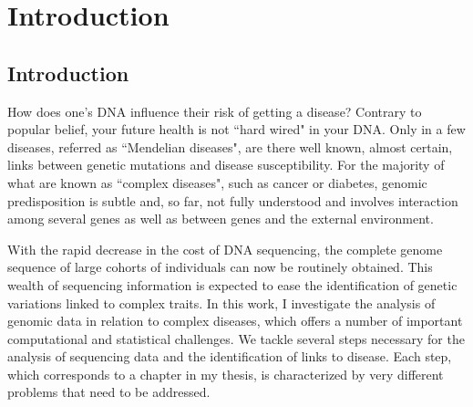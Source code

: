 \chapter{Introduction \label{ch:intro}}

\section{Introduction}

How does one's DNA influence their risk of getting a disease? Contrary to popular belief, your future health is not ``hard wired" in your DNA. 
Only in a few diseases, referred as ``Mendelian diseases", are there well known, almost certain, links between genetic mutations and disease susceptibility. 
For the majority of what are known as ``complex diseases", such as cancer or diabetes, genomic predisposition is subtle and, so far, not fully understood and involves interaction among several genes as well as between genes and the external environment.

With the rapid decrease in the cost of DNA sequencing, the complete genome sequence of large cohorts of individuals can now be routinely obtained.
This wealth of sequencing information is expected to ease the identification of genetic variations linked to complex traits. In this work, I investigate the analysis of genomic data in relation to complex diseases, which offers a number of important computational and statistical challenges. 
We tackle several steps necessary for the analysis of sequencing data and the identification of links to disease. 
Each step, which corresponds to a chapter in my thesis, is characterized by very different problems that need to be addressed.


